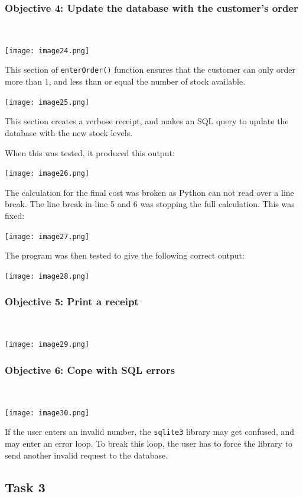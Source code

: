 \documentclass[a4paper]{article}
\begin{document}
\subsubsection{Objective 4: Update the database with the customer's order} ~\par
\noindent\texttt{[image: image24.png]} \par 
This section of \verb|enterOrder()| function ensures that the customer can only order more than 1, and less than or equal the number of stock available. ~\par
\noindent\texttt{[image: image25.png]} \par
This section creates a verbose receipt, and makes an SQL query to update the database with the new stock levels. \par
When this was tested, it produced this output: \par
\noindent\texttt{[image: image26.png]} \par 
The calculation for the final cost was broken as Python can not read over a line break. The line break in line 5 and 6 was stopping the full calculation. This was fixed: \par
\noindent\texttt{[image: image27.png]} \par 
The program was then tested to give the following correct output: \par
\noindent\texttt{[image: image28.png]} \par 
\newpage
\subsubsection{Objective 5: Print a receipt} ~\par
\noindent\texttt{[image: image29.png]} \par 
\subsubsection{Objective 6: Cope with SQL errors} ~\par
\noindent\texttt{[image: image30.png]} \par
If the user enters an invalid number, the \verb|sqlite3| library may get confused, and may enter an error loop. To break this loop, the user has to force the library to send another invalid request to the database.

\newpage
\subsection{Task 3}
\end{document}
